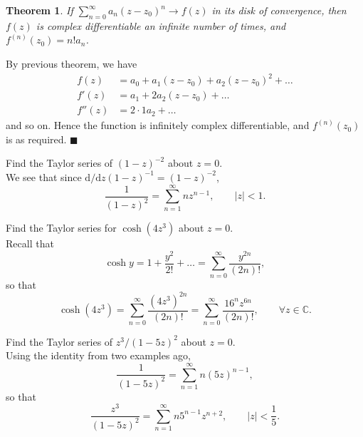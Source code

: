 \documentclass[letter-paper]{tufte-book}
\newtheorem{theorem}{\color{pastel-blue}Theorem}[section]
\newenvironment{proof}[1][Proof]{\begin{trivlist}
\item[\hskip \labelsep {\bfseries #1}]}{\end{trivlist}}
\newenvironment{example}[1][Example]{\begin{trivlist}
\item[\hskip \labelsep {\bfseries #1}]}{\end{trivlist}}
\newcommand{\qed}{\hfill$\blacksquare$}
\begin{document}
\begin{theorem}
  If $\sum^\infty_{n=0} a_n (z - z_0)^n \to f(z)$ in its disk of convergence,
  then $f(z)$ is complex differentiable an infinite number of times, and
  $f^{(n)}(z_0) = n! a_n$.
\end{theorem}
\begin{proof}
  By previous theorem, we have
  \begin{align*}
    f(z)   &= a_0 + a_1 (z - z_0) +   a_2 (z - z_0)^2 + \ldots\\
    f'(z)  &=       a_1           + 2 a_2 (z - z_0)   + \ldots\\
    f''(z) &=                       2\cdot 1 a_2      + \ldots
  \end{align*}
  and so on. Hence the function is infinitely complex differentiable, and
  $f^{(n)}(z_0)$ is as required. \qed
\end{proof}

\begin{example}
  Find the Taylor series of $(1 - z)^{-2}$ about $z = 0$.\\
  
  We see that since $\mathrm{d}/\mathrm{d}z (1 - z)^{-1} = (1 - z)^{-2}$,
  \begin{equation*}
    \frac{1}{(1 - z)^2} = \sum^\infty_{n=1} n z^{n-1}, \qquad |z| < 1.
  \end{equation*}
\end{example}

\begin{example}
  Find the Taylor series for $\cosh(4z^3)$ about $z = 0$.\\
  
  Recall that
  \begin{equation*}
    \cosh y = 1 + \frac{y^2}{2!} + \ldots = \sum^\infty_{n=0} \frac{y^{2n}}{(2n)!},
  \end{equation*}
  so that
  \begin{equation*}
    \cosh(4z^3) = \sum^\infty_{n=0} \frac{(4z^3)^{2n}}{(2n)!} = \sum^\infty_{n=0} \frac{16^n z^{6n}}{(2n)!}, \qquad \forall z \in \mathbb{C}.
  \end{equation*}
\end{example}

\begin{example}
  Find the Taylor series of $z^3 / (1-5z)^2$ about $z = 0$.\\
  
  Using the identity from two examples ago,
  \begin{equation*}
    \frac{1}{(1-5z)^2} = \sum^\infty_{n=1} n (5z)^{n-1},
  \end{equation*}
  so that
  \begin{equation*}
    \frac{z^3}{(1-5z)^2} = \sum^\infty_{n=1} n 5^{n-1} z^{n+2}, \qquad |z| < \frac{1}{5}.
  \end{equation*}
\end{example}
\end{document}
